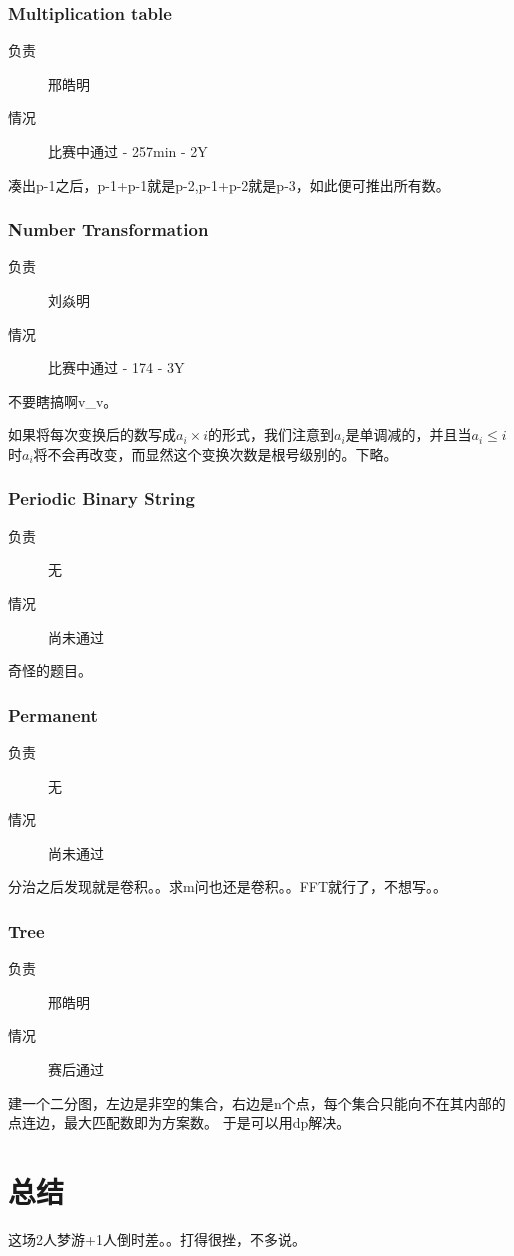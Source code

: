 \documentclass[a4paper, 11pt, nofonts, nocap, fancyhdr]{ctexart}
\newcommand{\problem}[1]{\subsubsection{#1}}
\begin{document}
\problem{Multiplication table}

\begin{description}
\item[负责] 邢皓明
\item[情况] 比赛中通过 - 257min - 2Y
\end{description}

凑出p-1之后，p-1+p-1就是p-2,p-1+p-2就是p-3，如此便可推出所有数。

\problem{Number Transformation}

\begin{description}
\item[负责] 刘焱明
\item[情况] 比赛中通过 - 174 - 3Y
\end{description}

不要瞎搞啊v\_v。

如果将每次变换后的数写成$a_i \times i$的形式，我们注意到$a_i$是单调减的，并且当$a_i \leq i$时$a_i$将不会再改变，而显然这个变换次数是根号级别的。下略。

\problem{Periodic Binary String}

\begin{description}
\item[负责] 无
\item[情况] 尚未通过
\end{description}

奇怪的题目。

\problem{Permanent}

\begin{description}
\item[负责] 无
\item[情况] 尚未通过
\end{description}

分治之后发现就是卷积。。求m问也还是卷积。。FFT就行了，不想写。。

\problem{Tree}

\begin{description}
\item[负责] 邢皓明
\item[情况] 赛后通过
\end{description}

建一个二分图，左边是非空的集合，右边是n个点，每个集合只能向不在其内部的点连边，最大匹配数即为方案数。
于是可以用dp解决。

\section{总结}

这场2人梦游+1人倒时差。。打得很挫，不多说。
\end{document}
